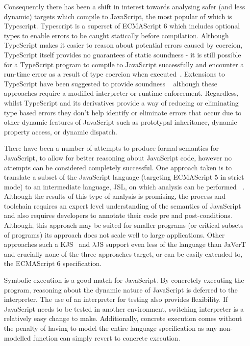 \documentclass[]{final_report}
\begin{document}
Consequently there has been a shift in interest towards analysing safer (and less dynamic) targets which compile to JavaScript, the most popular of which is Typescript. Typescript is a superset of ECMAScript 6 which includes optional types to enable errors to be caught statically before compilation. Although TypeScript makes it easier to reason about potential errors caused by coercion, TypeScript itself provides no guarantees of static soundness - it is still possible for a TypeScript program to compile to JavaScript successfully and encounter a run-time error as a result of type coercion when executed~\cite{bierman2014understanding}. Extensions to TypeScript have been suggested to provide soundness ~\cite{richards2015concrete, rastogi2015safe} although these approaches require a modified interpreter or runtime enforcement. Regardless, whilst TypeScript and its derivatives provide a way of reducing or eliminating type based errors they don't help identify or eliminate errors that occur due to other dynamic features of JavaScript such as prototypal inheritance, dynamic property access, or dynamic dispatch.

There have been a number of attempts to produce formal semantics for JavaScript, to allow for better reasoning about JavaScript code, however no attempts can be considered completely successful. One approach taken is to translate a subset of the JavaScript language (targeting ECMAScript 5 in strict mode) to an intermediate language, JSL, on which analysis can be performed ~\cite{gardner2012towards}. Although the results of this type of analysis is promising, the process and toolchain requires an expert level understanding of the semantics of JavaScript and also requires developers to annotate their code pre and post-conditions. Although, this approach may be suited for smaller programs (or critical subsets of programs) its approach does not scale well to large applications. Other approaches such a KJS~\cite{park2015kjs} and \ensuremath{\lambda}JS\cite{guha2010essence} support even less of the language than JaVerT and crucially none of the three approaches target, or can be easily extended to, the ECMAScript 6 specification.

Symbolic execution is a good match for JavaScript. By concretely executing the program, reasoning about the dynamic nature of JavaScript is deferred to the interpreter. The use of an interpreter for testing also provides flexibility. If JavaScript needs to be tested in another environment, switching interpreter is a relatively easy change to make. Additionally, concrete execution comes without the penalty of having to model the entire language specification as any non-modelled function can simply revert to concrete execution.
\end{document}
